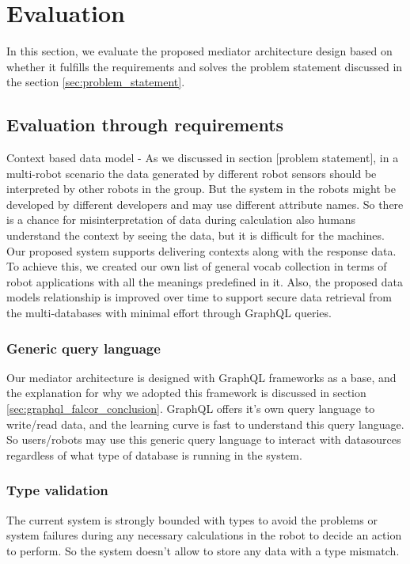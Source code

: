 

	\let\cleardoublepage\clearpage
\chapter{Evaluation}
In this section, we evaluate the proposed mediator architecture design based on whether it fulfills the requirements and solves the problem statement discussed in the section \ref{sec:problem_statement}. 

\section{Evaluation through requirements}
Context based data model - As we discussed in section [problem statement], in a multi-robot scenario the data generated by different robot sensors should be interpreted by other robots in the group. But the system in the robots might be developed by different developers and may use different attribute names. So there is a chance for misinterpretation of data during calculation also humans understand the context by seeing the data, but it is difficult for the machines. Our proposed system supports delivering contexts along with the response data. To achieve this, we created our own list of general vocab collection in terms of robot applications with all the meanings predefined in it. Also, the proposed data models relationship is improved over time to support secure data retrieval from the multi-databases with minimal effort through GraphQL queries.

\subsection{Generic query language}
Our mediator architecture is designed with GraphQL frameworks as a base, and the explanation for why we adopted this framework is discussed in section \ref{sec:graphql_falcor_conclusion}. GraphQL offers it's own query language to write/read data, and the learning curve is fast to understand this query language. So users/robots may use this generic query language to interact with datasources regardless of what type of database is running in the system.

\subsection{Type validation}
The current system is strongly bounded with types to avoid the problems or system failures during any necessary calculations in the robot to decide an action to perform. So the system doesn't allow to store any data with a type mismatch. 

